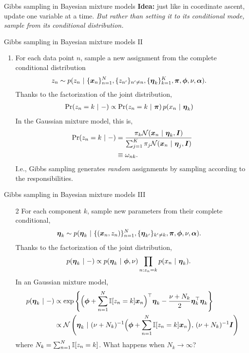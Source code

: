 \documentclass[aspectratio=169]{beamer}
\begin{document}
\begin{frame}[t]{Gibbs sampling in Bayesian mixture models}
\textbf{Idea: } just like in coordinate ascent, update one variable at a time. \textit{But rather than setting it to its conditional mode, sample from its conditional distribution.}
\end{frame} 
    
\begin{frame}{Gibbs sampling in Bayesian mixture models II}
\begin{enumerate}
    \item For each data point $n$, sample a new assignment from the complete conditional distribution
    \begin{align}
        z_n &\sim p(z_n ~\vert~ \{\boldsymbol{x}_n\}_{n=1}^N, \{z_{n'}\}_{n'\neq n}, \{\boldsymbol{\eta}_k\}_{k=1}^K, \boldsymbol{\pi}, \boldsymbol{\phi}, \nu, \boldsymbol{\alpha}).
    \end{align}
    Thanks to the factorization of the joint distribution,
    \begin{align}
        \Pr(z_n = k ~\vert~ -) 
        &\propto \Pr(z_n =k ~\vert~ \boldsymbol{\pi}) \, p(x_n ~\vert~ \boldsymbol{\eta}_k)
    \end{align}
    In the Gaussian mixture model, this is,
    \begin{align}
        \Pr(z_n = k ~\vert~ -) 
        &= \frac{\pi_k \mathcal{N}(\boldsymbol{x}_n ~\vert~ \boldsymbol{\eta}_k, \boldsymbol{I})}{\sum_{j=1}^K \pi_j \mathcal{N}(\boldsymbol{x}_n ~\vert~ \boldsymbol{\eta}_j, \boldsymbol{I})} \\
        &\equiv \omega_{nk}.
    \end{align}
    I.e., Gibbs sampling generates \textit{random} assignments by sampling according to the responsibilities. 
\end{enumerate}
\end{frame} 

\begin{frame}{Gibbs sampling in Bayesian mixture models III}
\begin{enumerate}
    \item[2] For each component $k$, sample new parameters from their complete conditional,
    \begin{align}
        \boldsymbol{\eta}_k &\sim p(\boldsymbol{\eta}_k ~\vert~ \{(\boldsymbol{x}_n, z_n)\}_{n=1}^N, \{\boldsymbol{\eta}_{k'}\}_{k'\neq k}, \boldsymbol{\pi}, \boldsymbol{\phi}, \nu, \boldsymbol{\alpha}).
    \end{align}
    Thanks to the factorization of the joint distribution,
    \begin{align}
        p(\boldsymbol{\eta}_k ~\vert~ -) &\propto p(\boldsymbol{\eta}_k ~\vert~ \boldsymbol{\phi}, \nu) \prod_{n: z_n=k} p(x_n ~\vert~ \boldsymbol{\eta}_k).
    \end{align}
    In an Gaussian mixture model,
    \begin{align}
        p(\boldsymbol{\eta}_k ~\vert~ -) &\propto \exp \left\{ \Big( \boldsymbol{\phi} + \sum_{n=1}^N \mathbb{I}[z_n=k] \boldsymbol{x}_n\Big)^\top \boldsymbol{\eta}_k  - \frac{\nu + N_k}{2} \boldsymbol{\eta}_k^\top \boldsymbol{\eta}_k \right\} \\
        &\propto \mathcal{N}\left(\boldsymbol{\eta}_k ~\vert~ (\nu + N_k)^{-1} \Big(\boldsymbol{\phi} + \sum_{n=1}^N \mathbb{I}[z_n=k] \boldsymbol{x}_n\Big), \, (\nu + N_k)^{-1} \boldsymbol{I} \right)
    \end{align}
    where $N_k = \sum_{n=1}^N \mathbb{I}[z_n =k]$. What happens when $N_k \to \infty$?
\end{enumerate}
\end{frame}
\end{document}
